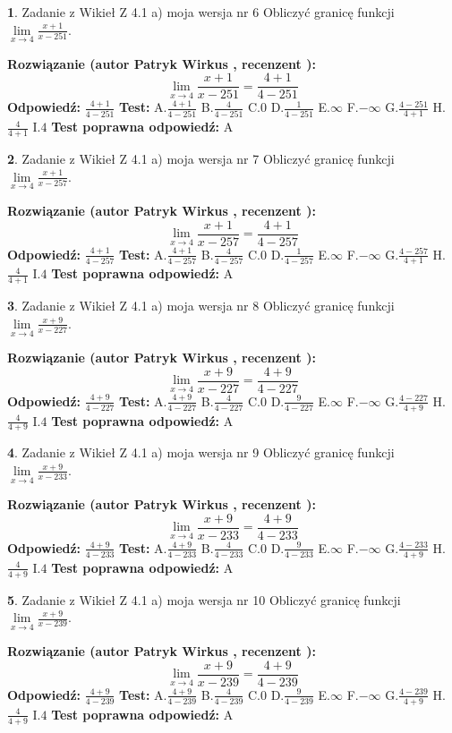 \documentclass[12pt, a4paper]{article}
\theoremstyle{definition} %
\newtheorem{zad}{}
\newcommand{\zadStart}[1]{\begin{zad}#1\newline}
\newcommand{\zadStop}{\end{zad}}
\newcommand{\rozwStart}[2]{\noindent \textbf{Rozwiązanie (autor #1 , recenzent #2): }\newline}
\newcommand{\rozwStop}{\newline}
\newcommand{\odpStart}{\noindent \textbf{Odpowiedź:}\newline}
\newcommand{\odpStop}{\newline}
\newcommand{\testStart}{\noindent \textbf{Test:}\newline}
\newcommand{\testStop}{\newline}
\newcommand{\kluczStart}{\noindent \textbf{Test poprawna odpowiedź:}\newline}
\newcommand{\kluczStop}{\newline}
\begin{document}
\zadStart{Zadanie z Wikieł Z 4.1 a) moja wersja nr 6}
Obliczyć granicę funkcji $\lim\limits_{x\to4}\frac{x+1}{x-251}$.
\zadStop
\rozwStart{Patryk Wirkus}{}
$$\lim\limits_{x\to4}\frac{x+1}{x-251} = \frac{4+1}{4-251}$$
\rozwStop
\odpStart
$\frac{4+1}{4-251}$
\odpStop
\testStart
A.$\frac{4+1}{4-251}$
B.$\frac{4}{4-251}$
C.$0$
D.$\frac{1}{4-251}$
E.$\infty$
F.$-\infty$
G.$\frac{4-251}{4+1}$
H.$\frac{4}{4+1}$
I.$4$
\testStop
\kluczStart
A
\kluczStop



\zadStart{Zadanie z Wikieł Z 4.1 a) moja wersja nr 7}
Obliczyć granicę funkcji $\lim\limits_{x\to4}\frac{x+1}{x-257}$.
\zadStop
\rozwStart{Patryk Wirkus}{}
$$\lim\limits_{x\to4}\frac{x+1}{x-257} = \frac{4+1}{4-257}$$
\rozwStop
\odpStart
$\frac{4+1}{4-257}$
\odpStop
\testStart
A.$\frac{4+1}{4-257}$
B.$\frac{4}{4-257}$
C.$0$
D.$\frac{1}{4-257}$
E.$\infty$
F.$-\infty$
G.$\frac{4-257}{4+1}$
H.$\frac{4}{4+1}$
I.$4$
\testStop
\kluczStart
A
\kluczStop



\zadStart{Zadanie z Wikieł Z 4.1 a) moja wersja nr 8}
Obliczyć granicę funkcji $\lim\limits_{x\to4}\frac{x+9}{x-227}$.
\zadStop
\rozwStart{Patryk Wirkus}{}
$$\lim\limits_{x\to4}\frac{x+9}{x-227} = \frac{4+9}{4-227}$$
\rozwStop
\odpStart
$\frac{4+9}{4-227}$
\odpStop
\testStart
A.$\frac{4+9}{4-227}$
B.$\frac{4}{4-227}$
C.$0$
D.$\frac{9}{4-227}$
E.$\infty$
F.$-\infty$
G.$\frac{4-227}{4+9}$
H.$\frac{4}{4+9}$
I.$4$
\testStop
\kluczStart
A
\kluczStop



\zadStart{Zadanie z Wikieł Z 4.1 a) moja wersja nr 9}
Obliczyć granicę funkcji $\lim\limits_{x\to4}\frac{x+9}{x-233}$.
\zadStop
\rozwStart{Patryk Wirkus}{}
$$\lim\limits_{x\to4}\frac{x+9}{x-233} = \frac{4+9}{4-233}$$
\rozwStop
\odpStart
$\frac{4+9}{4-233}$
\odpStop
\testStart
A.$\frac{4+9}{4-233}$
B.$\frac{4}{4-233}$
C.$0$
D.$\frac{9}{4-233}$
E.$\infty$
F.$-\infty$
G.$\frac{4-233}{4+9}$
H.$\frac{4}{4+9}$
I.$4$
\testStop
\kluczStart
A
\kluczStop



\zadStart{Zadanie z Wikieł Z 4.1 a) moja wersja nr 10}
Obliczyć granicę funkcji $\lim\limits_{x\to4}\frac{x+9}{x-239}$.
\zadStop
\rozwStart{Patryk Wirkus}{}
$$\lim\limits_{x\to4}\frac{x+9}{x-239} = \frac{4+9}{4-239}$$
\rozwStop
\odpStart
$\frac{4+9}{4-239}$
\odpStop
\testStart
A.$\frac{4+9}{4-239}$
B.$\frac{4}{4-239}$
C.$0$
D.$\frac{9}{4-239}$
E.$\infty$
F.$-\infty$
G.$\frac{4-239}{4+9}$
H.$\frac{4}{4+9}$
I.$4$
\testStop
\kluczStart
A
\kluczStop
\end{document}
